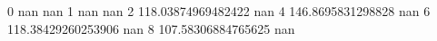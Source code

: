 0 nan nan
1 nan nan
2 118.03874969482422 nan
4 146.8695831298828 nan
6 118.38429260253906 nan
8 107.58306884765625 nan
